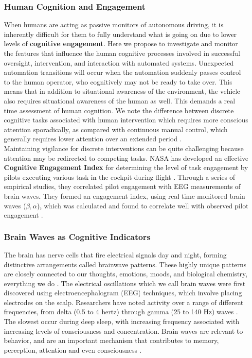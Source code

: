 \subsubsection{Human Cognition and Engagement}
When humans are acting as passive monitors of autonomous driving, it is inherently difficult for them to fully understand what is going on due to lower levels of \textbf{cognitive engagement}. Here we propose to investigate and monitor the features that influence the human cognitive processes involved in successful oversight, intervention, and interaction with automated systems.  Unexpected automation transitions will occur when the automation suddenly passes control to the human operator, who cognitively may not be ready to take over. This means that in addition to situational awareness of the environment, the vehicle also requires situational awareness of the human as well. This demands a real time assessment of human cognition. We note the difference between discrete cognitive tasks associated with human intervention which requires more conscious attention sporadically, as compared with continuous manual control, which generally requires lower attention over an extended period \cite{Endsley2017}.\\

Maintaining vigilance for discrete interventions can be quite challenging because attention may be redirected to competing tasks. NASA has developed an effective \textbf{Cognitive Engagement Index} for determining the level of task engagement by pilots executing various task in the cockpit during flight \cite{Hart1988}. Through a series of empirical studies, they correlated pilot engagement with EEG measurements of brain waves. They formed an engagement index, using real time monitored brain waves ($\beta,\alpha$), which was calculated and found to correlate well with observed pilot engagement \cite{Matthews2015,Cao2009}.

\subsubsection{Brain Waves as Cognitive Indicators}
The brain has nerve cells that fire electrical signals day and night, forming distinctive arrangements called brainwave patterns. These highly unique patterns are closely connected to our thoughts, emotions, moods, and biological chemistry, everything we do \cite{LopesdaSilva1991}. The electrical oscillations which we call brain waves were first discovered using electroencephalogram (EEG) techniques, which involve placing electrodes on the scalp. Researchers have noted activity over a range of different frequencies, from delta (0.5 to 4 hertz) through gamma (25 to 140 Hz) waves \cite{Klimesch,Kaufman1992,Buzsaki1994,Yamamoto1990}. 
The slowest occur during deep sleep, with increasing frequency associated with increasing levels of consciousness and concentration. Brain waves are relevant to behavior, and are an important mechanism that contributes to memory, perception, attention and even consciousness \cite{Miller1991,Fernandez1995}.\\

